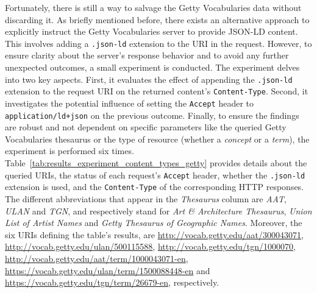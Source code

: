 Fortunately, there is still a way to salvage the Getty Vocabularies data without discarding it. As briefly mentioned before, there exists an alternative approach to explicitly instruct the Getty Vocabularies server to provide JSON-LD content. This involves adding a \texttt{.json-ld} extension to the URI in the request. However, to ensure clarity about the server's response behavior and to avoid any further unexpected outcomes, a small experiment is conducted. The experiment delves into two key aspects. First, it evaluates the effect of appending the \texttt{.json-ld} extension to the request URI on the returned content's \texttt{Content-Type}. Second, it investigates the potential influence of setting the \texttt{Accept} header to \texttt{application/ld+json} on the previous outcome. Finally, to ensure the findings are robust and not dependent on specific parameters like the queried Getty Vocabularies thesaurus or the type of resource (whether a \textit{concept} or a \textit{term}), the experiment is performed six times. Table~\ref{tab:results_experiment_content_types_getty} provides details about the queried URIs, the status of each request's \texttt{Accept} header, whether the \texttt{.json-ld} extension is used, and the \texttt{Content-Type} of the corresponding HTTP responses. The different abbreviations that appear in the \textit{Thesaurus} column are \textit{AAT}, \textit{ULAN} and \textit{TGN}, and respectively stand for \textit{Art \& Architecture Thesaurus}, \textit{Union List of Artist Names} and \textit{Getty Thesaurus of Geographic Names}. Moreover, the six URIs defining the table's results, are \url{http://vocab.getty.edu/aat/300043071}, \url{http://vocab.getty.edu/ulan/500115588}, \url{http://vocab.getty.edu/tgn/1000070}, \url{http://vocab.getty.edu/aat/term/1000043071-en}, \url{https://vocab.getty.edu/ulan/term/1500088448-en} and \url{https://vocab.getty.edu/tgn/term/26679-en}, respectively.


